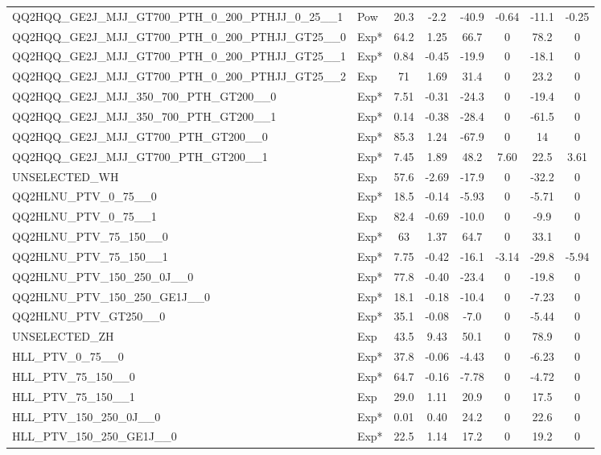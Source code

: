 \begin{table}[!h]
\begin{tabular}{llcccccc}
 QQ2HQQ\_GE2J\_MJJ\_GT700\_PTH\_0\_200\_PTHJJ\_0\_25\_\_1 & Pow & 20.3 & -2.2 & -40.9 & -0.64 & -11.1 & -0.25 \\
 QQ2HQQ\_GE2J\_MJJ\_GT700\_PTH\_0\_200\_PTHJJ\_GT25\_\_0 & Exp* & 64.2 & 1.25 & 66.7 & 0 & 78.2 & 0 \\
 QQ2HQQ\_GE2J\_MJJ\_GT700\_PTH\_0\_200\_PTHJJ\_GT25\_\_1 & Exp* & 0.84 & -0.45 & -19.9 & 0 & -18.1 & 0 \\
 QQ2HQQ\_GE2J\_MJJ\_GT700\_PTH\_0\_200\_PTHJJ\_GT25\_\_2 & Exp & 71 & 1.69 & 31.4 & 0 & 23.2 & 0 \\
 QQ2HQQ\_GE2J\_MJJ\_350\_700\_PTH\_GT200\_\_0 & Exp* & 7.51 & -0.31 & -24.3 & 0 & -19.4 & 0 \\
 QQ2HQQ\_GE2J\_MJJ\_350\_700\_PTH\_GT200\_\_1 & Exp* & 0.14 & -0.38 & -28.4 & 0 & -61.5 & 0 \\
 QQ2HQQ\_GE2J\_MJJ\_GT700\_PTH\_GT200\_\_0 & Exp* & 85.3 & 1.24 & -67.9 & 0 & 14 & 0 \\
 QQ2HQQ\_GE2J\_MJJ\_GT700\_PTH\_GT200\_\_1 & Exp* & 7.45 & 1.89 & 48.2 & 7.60 & 22.5 & 3.61 \\
 UNSELECTED\_WH & Exp & 57.6 & -2.69 & -17.9 & 0 & -32.2 & 0 \\
 QQ2HLNU\_PTV\_0\_75\_\_0 & Exp* & 18.5 & -0.14 & -5.93 & 0 & -5.71 & 0 \\
 QQ2HLNU\_PTV\_0\_75\_\_1 & Exp & 82.4 & -0.69 & -10.0 & 0 & -9.9 & 0 \\
 QQ2HLNU\_PTV\_75\_150\_\_0 & Exp* & 63 & 1.37 & 64.7 & 0 & 33.1 & 0  \\
 QQ2HLNU\_PTV\_75\_150\_\_1 & Exp* & 7.75 & -0.42 & -16.1 & -3.14 & -29.8 & -5.94 \\
 QQ2HLNU\_PTV\_150\_250\_0J\_\_0 & Exp* & 77.8 & -0.40 & -23.4 & 0 & -19.8 & 0 \\
 QQ2HLNU\_PTV\_150\_250\_GE1J\_\_0 & Exp* & 18.1 & -0.18 & -10.4 & 0 & -7.23 & 0 \\
 QQ2HLNU\_PTV\_GT250\_\_0 & Exp* & 35.1 & -0.08 & -7.0 & 0 & -5.44 & 0 \\
 UNSELECTED\_ZH & Exp & 43.5 & 9.43 & 50.1 & 0 & 78.9 & 0 \\
 HLL\_PTV\_0\_75\_\_0 & Exp* & 37.8 & -0.06 & -4.43 & 0 & -6.23 & 0 \\
 HLL\_PTV\_75\_150\_\_0 & Exp* & 64.7 & -0.16 & -7.78 & 0 & -4.72 & 0 \\
 HLL\_PTV\_75\_150\_\_1 & Exp & 29.0 & 1.11 & 20.9 & 0 & 17.5 & 0 \\
 HLL\_PTV\_150\_250\_0J\_\_0 & Exp* & 0.01 & 0.40 & 24.2 & 0 & 22.6 & 0 \\
 HLL\_PTV\_150\_250\_GE1J\_\_0 & Exp* & 22.5 & 1.14 & 17.2 & 0 & 19.2 & 0 \\

\end{tabular}
\end{table}
